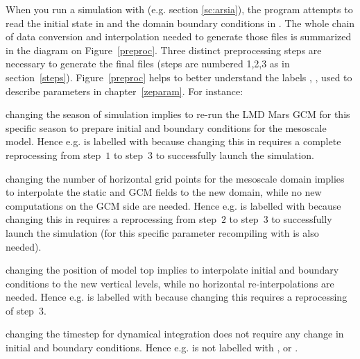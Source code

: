 \sk
When you run a simulation with  (e.g. section \ref{sc:arsia}), the program attempts to read the initial state in  and the domain boundary conditions in . The whole chain of data conversion and interpolation needed to generate those files is summarized in the diagram on Figure~\ref{preproc}. Three distinct preprocessing steps are necessary to generate the final files (steps are numbered 1,2,3 as in section~\ref{steps}). Figure~\ref{preproc} helps to better understand the labels , ,  used to describe  parameters in chapter~\ref{zeparam}. For instance: 
\begin{finger}
\item changing the season of simulation implies to re-run the LMD Mars GCM for this specific season to prepare initial and boundary conditions for the mesoscale model. Hence e.g.  is labelled with  because changing this in  requires a complete reprocessing from step~$1$ to step~$3$ to successfully launch the simulation.
\item changing the number of horizontal grid points for the mesoscale domain implies to interpolate the static and GCM fields to the new domain, while no new computations on the GCM side are needed. Hence e.g.  is labelled with  because changing this in  requires a reprocessing from step~$2$ to step~$3$ to successfully launch the simulation (for this specific parameter recompiling with  is also needed).
\item changing the position of model top implies to interpolate initial and boundary conditions to the new vertical levels, while no horizontal re-interpolations are needed. Hence e.g.  is labelled with  because changing this requires a reprocessing of step~$3$.
\item changing the timestep for dynamical integration does not require any change in initial and boundary conditions. Hence e.g.  is not labelled with ,  or .
\end{finger}

